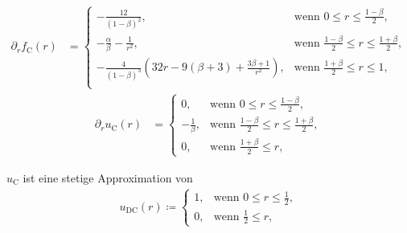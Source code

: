 \begin{align*}
  \partial_r f_\textrm{C}(r) &= 
  \begin{cases}
    -\frac{12}{(1-\beta)^2},&\text{wenn }0\leq r\leq\frac{1-\beta}{2},\\
    -\frac{\alpha}{\beta}-\frac{1}{r^2},&
    \text{wenn } \frac{1-\beta}{2}\leq r\leq \frac{1+\beta}{2},\\
    -\frac{4}{(1-\beta)^3}\left( 32r-9(\beta+3)+\frac{3\beta+1}{r^2} \right)\!,&
    \text{wenn } \frac{1+\beta}{2}\leq r\leq 1,\\
  \end{cases}
\end{align*}
\begin{align*}
  \partial_r u_\textrm{C}(r) &= 
  \begin{cases}
    0,&\text{wenn }0\leq r\leq\frac{1-\beta}{2},\\
    -\frac{1}{\beta},&
    \text{wenn } \frac{1-\beta}{2}\leq r\leq \frac{1+\beta}{2},\\
    0,&\text{wenn } \frac{1+\beta}{2}\leq r,
  \end{cases}
\end{align*}

$u_\textrm{C}$ ist eine stetige Approximation von
\begin{align*}
  u_\textrm{DC}(r)\coloneqq 
  \begin{cases}
    1, & \text{wenn } 0\leq r\leq\frac{1}{2},\\
    0, & \text{wenn } \frac{1}{2}\leq r,
  \end{cases}
\end{align*}

